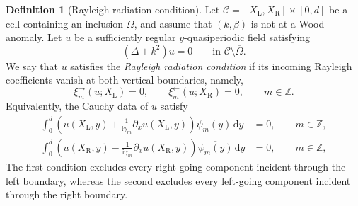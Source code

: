 \documentclass[11pt,fleqn]{article}
\newcommand{\ii}{\mathrm{i}}
\newcommand{\dd}{\mathrm{d}}
\theoremstyle{definition}
\newtheorem{definition}{Definition}
\theoremstyle{remark}
\begin{document}
\begin{definition}[Rayleigh radiation condition]
\label{def:rayleigh-radiation-condition}
Let \(\mathcal C=[X_\mathrm{L},X_\mathrm{R}]\times[0,d]\) be a cell
containing an inclusion \(\Omega\), and assume that \((k,\beta)\) is not at a
Wood anomaly. Let \(u\) be a sufficiently regular \(y\)-quasiperiodic field
satisfying
\[
  (\Delta+k^2)u=0
  \qquad\text{in }\mathcal C\setminus\overline\Omega.
\]
We say that \(u\) satisfies the \emph{Rayleigh radiation condition} if its
incoming Rayleigh coefficients vanish at both vertical boundaries, namely,
\[
  \xi_m^\rightarrow(u;X_\mathrm{L})=0,
  \qquad
  \xi_m^\leftarrow(u;X_\mathrm{R})=0,
  \qquad m\in\mathbb Z.
\]
Equivalently, the Cauchy data of \(u\) satisfy
\begin{align}
  \int_0^d
  \left(
    u(X_\mathrm{L},y)
    +\frac{1}{\ii\gamma_m}\partial_xu(X_\mathrm{L},y)
  \right)\overline{\psi_m(y)}\,\dd y
  &=0,
  \qquad m\in\mathbb Z,
  \label{eq:left-outgoing-rayleigh-condition}\\
  \int_0^d
  \left(
    u(X_\mathrm{R},y)
    -\frac{1}{\ii\gamma_m}\partial_xu(X_\mathrm{R},y)
  \right)\overline{\psi_m(y)}\,\dd y
  &=0,
  \qquad m\in\mathbb Z,
  \label{eq:right-outgoing-rayleigh-condition}
\end{align}
The first condition excludes every right-going component incident through
the left boundary, whereas the second excludes every left-going component
incident through the right boundary.
\end{definition}
\end{document}
